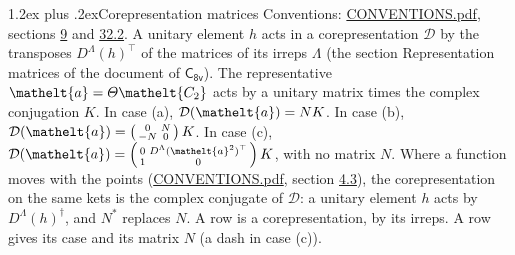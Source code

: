 \documentclass[10pt,a4paper]{article}
\makeatletter
\renewcommand\section{\@startsection{section}{1}{\z@}{-3ex plus -1ex minus -.2ex}%
  {1.2ex plus .2ex}{\normalfont\large\sffamily\bfseries\color{parttitle}}}
\numberwithin{equation}{section}
\newcommand{\eltfont}[1]{{\let\sigma\eltsigma\mathelt{#1}}}
\newcommand{\grp}[1]{\mathsf{#1}}
\newcommand{\elt}[1]{\eltfont{#1}}
\makeatother
\begin{document}
\section{Corepresentation matrices}\label{s:corep_matrices}
Conventions: \href{../../CONVENTIONS.pdf}{CONVENTIONS.pdf}, sections \href{../../../rotation/CONVENTIONS.pdf\#conv.9}{9} and \href{../../CONVENTIONS.pdf\#conv.32.2}{32.2}.
A unitary element $h$ acts in a corepresentation $\mathcal{D}$ by the transposes $D^{\Lambda}(h)^{\top}$ of the matrices of its irreps $\Lambda$ (the section Representation matrices of the document of \href{../../../rotation/data/pdf/C8v.pdf}{$\grp{C_{8v}}$}). The representative $\elt{a} = \varTheta\elt{C_{2}}$ acts by a unitary matrix times the complex conjugation $K$.
In case (a), $\mathcal{D}(\elt{a}) = NK$. In case (b), $\mathcal{D}(\elt{a}) = \left(\begin{smallmatrix} 0 & N \\ -N & 0 \end{smallmatrix}\right) K$. In case (c), $\mathcal{D}(\elt{a}) = \left(\begin{smallmatrix} 0 & D^{\Lambda}(\elt{a}^2)^{\top} \\ 1 & 0 \end{smallmatrix}\right) K$, with no matrix $N$.
Where a function moves with the points (\href{../../CONVENTIONS.pdf}{CONVENTIONS.pdf}, section \href{../../../rotation/CONVENTIONS.pdf\#conv.4.3}{4.3}), the corepresentation on the same kets is the complex conjugate of $\mathcal{D}$: a unitary element $h$ acts by $D^{\Lambda}(h)^{\dagger}$, and $N^{*}$ replaces $N$.
A row is a corepresentation, by its irreps. A row gives its case and its matrix $N$ (a dash in case (c)).
\end{document}
